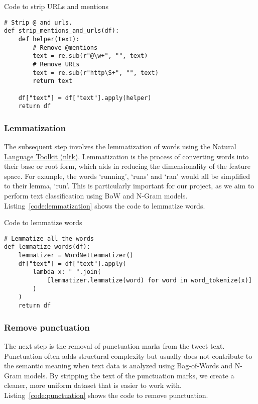\documentclass{article}
\begin{document}
\begin{listing}[H]
\caption{Code to strip URLs and mentions}
\label{code:url}
\begin{verbatim}
# Strip @ and urls.
def strip_mentions_and_urls(df):
    def helper(text):
        # Remove @mentions
        text = re.sub(r"@\w+", "", text)
        # Remove URLs
        text = re.sub(r"http\S+", "", text)
        return text

    df["text"] = df["text"].apply(helper)
    return df
\end{verbatim}
\end{listing}


\subsubsection{Lemmatization}

The subsequent step involves the lemmatization of words using the \href{https://www.nltk.org/}{Natural Language Toolkit (nltk)}. Lemmatization is the process of converting words into their base or root form, which aids in reducing the dimensionality of the feature space. For example, the words ‘running', ‘runs' and ‘ran' would all be simplified to their lemma, ‘run'. This is particularly important for our project, as we aim to perform text classification using BoW and N-Gram models. Listing~\ref{code:lemmatization} shows the code to lemmatize words.

\begin{listing}[H]
\caption{Code to lemmatize words}
\label{code:lemmatization}
\begin{verbatim}
# Lemmatize all the words
def lemmatize_words(df):
    lemmatizer = WordNetLemmatizer()
    df["text"] = df["text"].apply(
        lambda x: " ".join(
            [lemmatizer.lemmatize(word) for word in word_tokenize(x)]
        )
    )
    return df
\end{verbatim}
\end{listing}


\subsubsection{Remove punctuation}

The next step is the removal of punctuation marks from the tweet text. Punctuation often adds structural complexity but usually does not contribute to the semantic meaning when text data is analyzed using Bag-of-Words and N-Gram models. By stripping the text of the punctuation marks, we create a cleaner, more uniform dataset that is easier to work with. Listing~\ref{code:punctuation} shows the code to remove punctuation.
\end{document}
